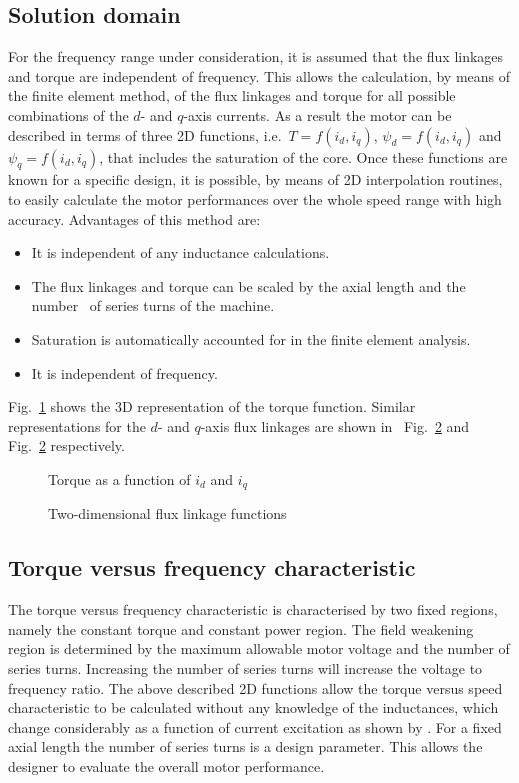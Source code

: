 \subsection{Solution domain}
For the frequency range under consideration, it is assumed that the flux linkages and torque are independent of frequency. This allows the calculation, by means of the finite element method, of the flux linkages and torque for all possible combinations of the $d$- and $q$-axis currents. As a result the motor can be described in terms of three 2D functions, i.e.~$T= f(i_{d},i_{q})$, $\psi_{d} = f(i_{d},i_{q})$ and $\psi_{q} = f(i_{d},i_{q})$, that includes the saturation of the core. Once these functions are known for a specific design, it is possible, by means of 2D interpolation routines, to easily calculate the motor performances over the whole speed range with high accuracy. Advantages of this method are:
\begin{itemize}
	\item It is independent of any inductance calculations.
	\item The flux linkages and torque can be scaled by the axial length and the number~%
	of series turns of the machine.
	\item Saturation is automatically accounted for in the finite element analysis.
	\item It is independent of frequency.
\end{itemize}
Fig.~\ref{fig:2d_torque} shows the 3D representation of the torque function. Similar representations for the $d$- and $q$-axis flux linkages are shown in~%
Fig.~\ref{fig:Main_2D_psi} and~%
Fig.~\ref{fig:Main_2D_psi} respectively.
\begin{figure}[htbp]
	\centering
		
	\caption{Torque as a function of $i_d$ and $i_q$}
	\label{fig:2d_torque}
\end{figure}
\begin{figure}[htbp]
	\centering
	
	\vspace{0.2cm}
	
	\caption{Two-dimensional flux linkage functions}
	\label{fig:Main_2D_psi}
\end{figure}

\subsection{Torque versus frequency characteristic}\label{subsec:t_vs_f}
The torque versus frequency characteristic is characterised by two fixed regions, namely the constant torque and constant power region. The field weakening region is determined by the maximum allowable motor voltage and the number of series turns. Increasing the number of series turns will increase the voltage to frequency ratio. The above described 2D functions allow the torque versus speed characteristic to be
calculated without any knowledge of the inductances, which change considerably as a function of current excitation as shown by \cite{bech_2005}. For a fixed axial length the number of series turns is a design parameter. This allows the designer to evaluate the overall motor performance.

